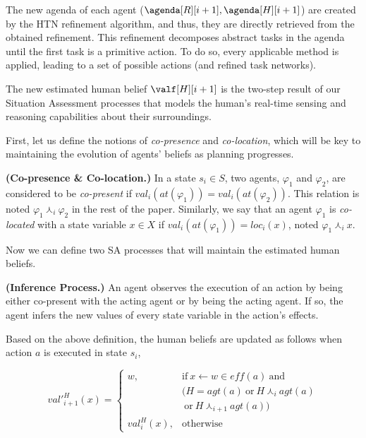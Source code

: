 {The new agenda of each agent ($\agenda[R][i+1], \agenda[H][i+1]$) are created by the HTN refinement algorithm, and thus, they are directly retrieved from the obtained refinement. 
This refinement decomposes abstract tasks in the agenda until the first task is a primitive action. To do so, every applicable method is applied, leading to a set of possible actions (and refined task networks).

The new estimated human belief $\valf[H][i+1]$ is the two-step result of our Situation Assessment processes that models the human's real-time sensing and reasoning capabilities about their surroundings.

First, let us define the notions of \textit{co-presence} and \textit{co-location}, which will be key to maintaining the evolution of agents' beliefs as planning progresses.

\begin{definition} \label{def:co-pre-loc}
    \textbf{(Co-presence \& Co-location.)} In a state $s_i \in S$, two agents, $\varphi_1$ and $\varphi_2$, are considered to be \textit{co-present} if $val_i(at(\varphi_1)) = val_i(at(\varphi_2))$. This relation is noted $\varphi_1 \curlywedge_i \varphi_2$ in the rest of the paper. Similarly, we say that an agent $\varphi_1$ is \textit{co-located} with a state variable $x \in X$ if $val_i(at(\varphi_1)) = loc_i(x)$, noted $\varphi_1 \curlywedge_i x$.
\end{definition}

Now we can define two SA processes that will maintain the estimated human beliefs.

\begin{definition} \label{def:new_inf}
    \textbf{(Inference Process.)} An agent observes the execution of an action by being either co-present with the acting agent 
    or by being the acting agent. If so, the agent infers the new values of every state variable in the action's effects.
\end{definition}

Based on the above definition, the human beliefs are updated as follows when action $a$ is executed in state $s_i$, 

\begin{equation}
val'^H_{i+1}(x) = \left\{ 
\begin{array}{ll}
    w, & \mbox{if} ~ x \leftarrow w \in \textit{eff}(a) ~ \mbox{and}  \\ 
    & (H = \textit{agt}(a) ~\mbox{or}~ H \curlywedge_i \textit{agt}(a)\\
    & ~\mbox{or}~ H \curlywedge_{i+1} \textit{agt}(a))\\
    val^H_i(x), & \mbox{otherwise}
\end{array}\right.
\end{equation}

}
